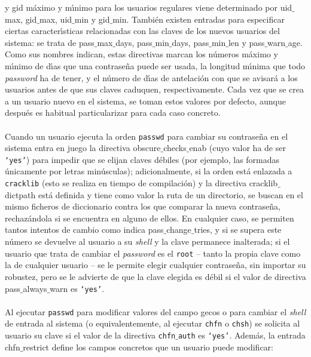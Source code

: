 y {\sc gid} m\'aximo y m\'{\i}nimo para los usuarios regulares viene determinado
por {\sc uid$\_$max}, {\sc gid$\_$max}, {\sc uid$\_$min} y {\sc gid$\_$min}.
Tambi\'en existen entradas para especificar ciertas caracter\'{\i}sticas 
relacionadas con las claves de los nuevos usuarios del sistema: se trata de {\sc
pass$\_$max$\_$days}, {\sc pass$\_$min$\_$days}, {\sc pass$\_$min$\_$len} y {\sc
pass$\_$warn$\_$age}. Como sus nombres indican, estas directivas marcan los
n\'umeros m\'aximo y m\'{\i}nimo de d\'{\i}as que una contrase\~na puede ser 
usada, la longitud m\'{\i}nima que todo {\it password} ha de tener, y el 
n\'umero de d\'{\i}as de antelaci\'on con que se avisar\'a a los usuarios antes 
de que sus claves caduquen, respectivamente. Cada vez que se crea a un usuario
nuevo en el sistema, se toman estos valores por defecto, aunque despu\'es es
habitual particularizar para cada caso concreto.\\
\\Cuando un usuario ejecuta la orden {\tt passwd} para cambiar su contrase\~na
en el sistema entra en juego la directiva {\sc obscure$\_$checks$\_$enab} 
(cuyo valor ha de ser {\tt `yes'}) para impedir que se elijan claves d\'ebiles
(por ejemplo, las formadas \'unicamente por letras min\'usculas); 
adicionalmente, si la orden est\'a enlazada a {\tt cracklib} (esto se realiza
en tiempo de compilaci\'on) y la directiva {\sc cracklib$\_$dictpath} est\'a
definida y tiene como valor la ruta de un directorio, se buscan en el mismo
ficheros de diccionario contra los que comparar la nueva contrase\~na, 
rechaz\'andola si se encuentra en alguno de ellos. En cualquier caso, se 
permiten tantos intentos de cambio como indica {\sc pass$\_$change$\_$tries}, y
si se supera este n\'umero se devuelve al usuario a su {\it shell} y la clave
permanece inalterada; si el usuario que trata de cambiar el {\it password} es 
el {\tt root} -- tanto la propia clave como la de cualquier usuario -- se le
permite elegir cualquier contrase\~na, sin importar su robustez, pero se le
advierte de que la clave elegida es d\'ebil si el valor de directiva {\sc
pass$\_$always$\_$warn} es {\tt `yes'}.\\
\\Al ejecutar {\tt passwd} para modificar valores del campo {\sc gecos} o para
cambiar el {\it shell} de entrada al sistema (o equivalentemente, al ejecutar
{\tt chfn} o {\tt chsh}) se solicita al usuario su clave si el valor de la 
directiva {\tt chfn$\_$auth} es {\tt `yes'}. Adem\'as, la entrada {\sc 
chfn$\_$restrict} define los campos concretos que un usuario puede modificar: 
